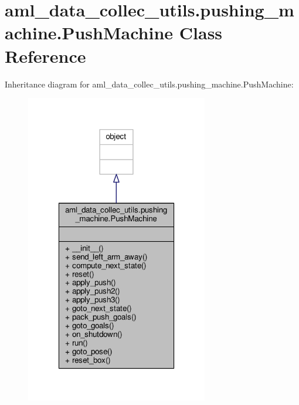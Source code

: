 \hypertarget{classaml__data__collec__utils_1_1pushing__machine_1_1_push_machine}{\section{aml\-\_\-data\-\_\-collec\-\_\-utils.\-pushing\-\_\-machine.\-Push\-Machine Class Reference}
\label{classaml__data__collec__utils_1_1pushing__machine_1_1_push_machine}
}


Inheritance diagram for aml\-\_\-data\-\_\-collec\-\_\-utils.\-pushing\-\_\-machine.\-Push\-Machine\-:\nopagebreak
\begin{figure}[H]
\begin{center}
\leavevmode
\includegraphics[width=226pt]{classaml__data__collec__utils_1_1pushing__machine_1_1_push_machine__inherit__graph}
\end{center}
\end{figure}


